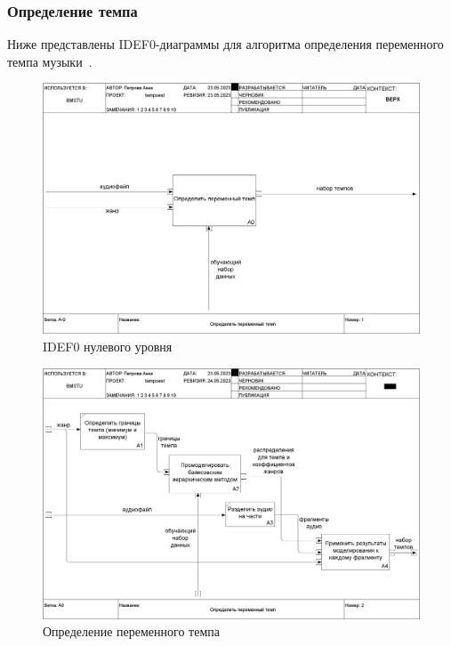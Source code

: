 \subsubsection{Определение темпа}

Ниже представлены IDEF0-диаграммы для алгоритма определения переменного темпа музыки~\cite{kubler_pymc3,bayesian}.

\begin{figure}[h]
	\centering
	\includegraphics[scale=0.25]{inc/img/tempo_idef/01_A-0.png}
	\caption{IDEF0 нулевого уровня}
	\label{img:tempo_0}
\end{figure}

\begin{figure}[h]
	\centering
	\includegraphics[scale=0.25]{inc/img/tempo_idef/02_A0.png}
	\caption{Определение переменного темпа}
	\label{img:tempo_1}
\end{figure}

